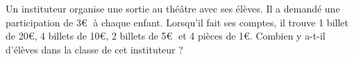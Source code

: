 \documentclass[exercice]{thedocument}%
\begin{document}
%
Un instituteur organise une sortie au théâtre avec ses élèves. Il a demandé une participation 
de 3\euro$\;$ à chaque enfant. Lorsqu'il fait ses comptes, il trouve 1 billet de 20\euro,
4 billets de 10\euro, 2 billets de 5\euro$\;$ et 4 pièces de 1\euro. Combien y a-t-il
d'élèves dans la classe de cet instituteur ?
\end{document}
